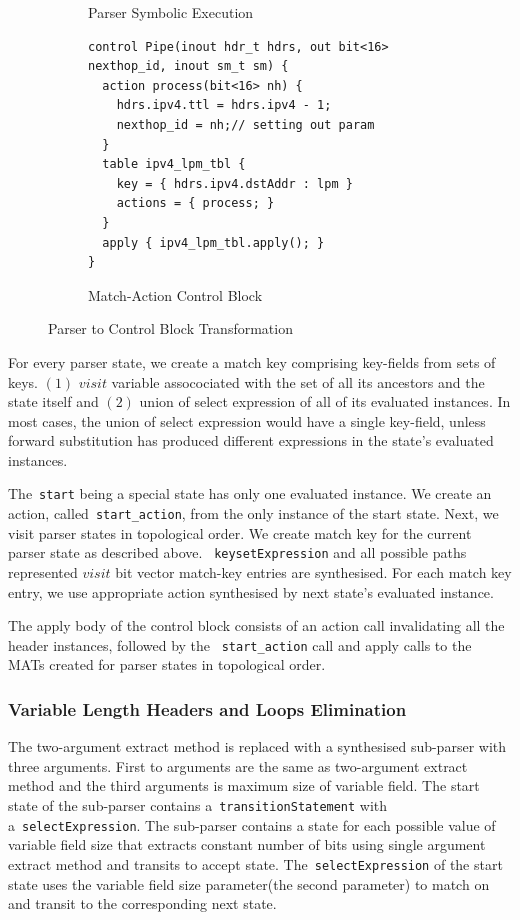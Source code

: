 \begin{figure}[!h]
\begin{subfigure}[b]{0.3\linewidth}
        \caption{Parser Symbolic Execution}
        \label{subfig:parser-symbolic-execution}
    \end{subfigure}
    \begin{subfigure}[b]{.4\linewidth}
\begin{lstlisting}[frame=none]
control Pipe(inout hdr_t hdrs, out bit<16> nexthop_id, inout sm_t sm) {
  action process(bit<16> nh) {
    hdrs.ipv4.ttl = hdrs.ipv4 - 1;
    nexthop_id = nh;// setting out param
  }
  table ipv4_lpm_tbl {
    key = { hdrs.ipv4.dstAddr : lpm } 
    actions = { process; }
  }
  apply { ipv4_lpm_tbl.apply(); }
}
\end{lstlisting}
\caption{Match-Action Control Block}
\label{subfig:parser-symbolic-execution}
\end{subfigure}
\caption{Parser to Control Block Transformation}
\label{fig:parser-to-control-block-transformation}
\end{figure}

For every parser state, we create a match key comprising key-fields from sets of keys. 
$(1)$ $visit$ variable assocociated with the set of all its ancestors and the state itself and
$(2)$ union of select expression of all of its evaluated instances.
In most cases, the union of select expression would have a single key-field, unless forward substitution has produced different expressions in the state's evaluated instances.

The~\texttt{start} being a special state has only one evaluated instance.
We create an action, called~\texttt{start\_action}, from the only instance of the start state.
Next, we visit parser states in topological order. 
We create match key for the current parser state as described above.
~\texttt{keysetExpression} and all possible paths represented $visit$ bit vector match-key entries are synthesised.
For each match key entry, we use appropriate action synthesised by next state's evaluated instance.

The apply body of the control block consists of an action call invalidating all the header instances, followed by the ~\texttt{start\_action} call and apply calls to the MATs created for parser states in topological order.



\subsubsection{Variable Length Headers and Loops Elimination}
\label{variable-length-headers-loops-and-elimination}
The two-argument extract method is replaced with a synthesised sub-parser with three arguments.
First to arguments are the same as two-argument extract method and the third arguments is maximum size of variable field.
The start state of the sub-parser contains a~\texttt{transition\-Statement} with a~\texttt{select\-Expression}.
The sub-parser contains a state for each possible value of variable field size that extracts constant number of bits using single argument extract method and transits to accept state.
The~\texttt{select\-Expression} of the start state uses the variable field size parameter(the second parameter) to match on and transit to the corresponding next state.

